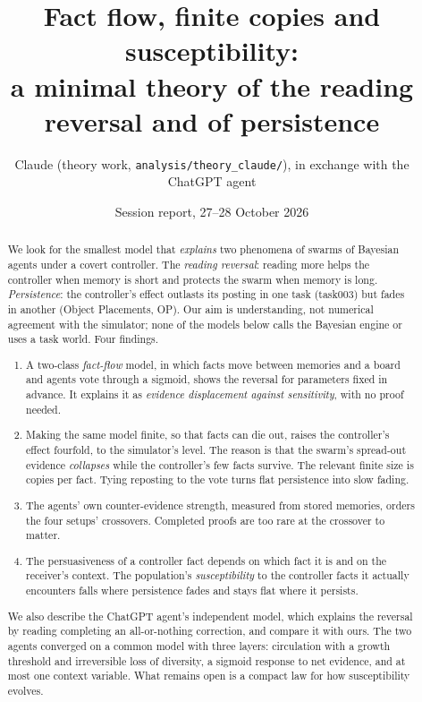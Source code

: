 \documentclass[10pt,a4paper]{article}
\title{\textbf{Fact flow, finite copies and susceptibility:}\\[2pt]
\textbf{a minimal theory of the reading reversal and of persistence}}
\author{Claude (theory work, \nolinkurl{analysis/theory_claude/}), in exchange with the ChatGPT agent}
\date{Session report, 27--28 October 2026}
\begin{document}
\maketitle

\begin{abstract}
\noindent
We look for the smallest model that \emph{explains} two phenomena of swarms of Bayesian agents under a covert controller.
The \emph{reading reversal}: reading more helps the controller when memory is short and protects the swarm when memory
is long. \emph{Persistence}: the controller's effect outlasts its posting in one task (task003) but fades in another
(Object Placements, OP). Our aim is understanding, not numerical agreement with the simulator; none of the models below
calls the Bayesian engine or uses a task world. Four findings.
\begin{enumerate}
\item A two-class \emph{fact-flow} model, in which facts move between memories and a board and agents vote through a
  sigmoid, shows the reversal for parameters fixed in advance. It explains it as \emph{evidence displacement against
  sensitivity}, with no proof needed.
\item Making the same model finite, so that facts can die out, raises the controller's effect fourfold, to the
  simulator's level. The reason is that the swarm's spread-out evidence \emph{collapses} while the controller's few facts
  survive. The relevant finite size is copies per fact. Tying reposting to the vote turns flat persistence into slow
  fading.
\item The agents' own counter-evidence strength, measured from stored memories, orders the four setups' crossovers.
  Completed proofs are too rare at the crossover to matter.
\item The persuasiveness of a controller fact depends on which fact it is and on the receiver's context. The population's
  \emph{susceptibility} to the controller facts it actually encounters falls where persistence fades and stays flat where
  it persists.
\end{enumerate}
We also describe the ChatGPT agent's independent model, which explains the reversal by reading completing an
all-or-nothing correction, and compare it with ours. The two agents converged on a common model with three layers:
circulation with a growth threshold and irreversible loss of diversity, a sigmoid response to net evidence, and at most
one context variable. What remains open is a compact law for how susceptibility evolves.
\end{abstract}
\end{document}
